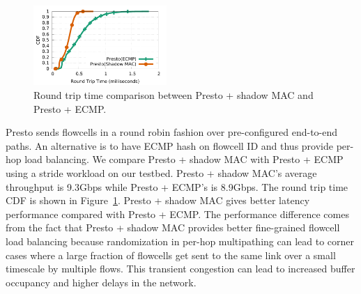 \begin{figure}[t]
        \centering
  \includegraphics[width=0.45\textwidth]{presto/figures/presto_compare_2modes/presto_compare_2mods.pdf}
        \caption{Round trip time comparison between Presto + shadow MAC and Presto + ECMP.
		}
        \label{micro_presto_2mods}
\end{figure}

Presto sends flowcells in a round robin fashion over pre-configured end-to-end paths. An alternative is to
have ECMP hash on flowcell ID and thus provide per-hop load balancing. 
We compare Presto + shadow MAC with Presto + ECMP using a stride workload on our testbed. 
Presto + shadow MAC's average throughput is 9.3Gbps while Presto + ECMP's is 8.9Gbps.
The round trip time CDF is shown in Figure~\ref{micro_presto_2mods}. 
Presto + shadow MAC gives better latency performance compared with Presto + ECMP. 
The performance difference comes from the fact that Presto + shadow MAC provides 
better fine-grained flowcell load balancing because 
randomization in per-hop multipathing can lead to corner cases where
a large fraction of flowcells get sent to the same link over a small timescale by multiple flows. This transient congestion
can lead to increased buffer occupancy and higher delays in the network.
